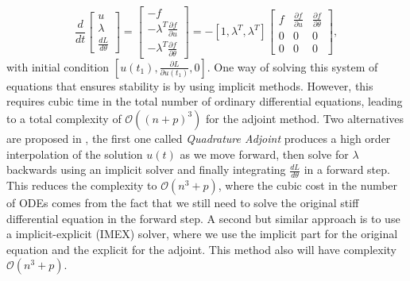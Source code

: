 \begin{equation}
    \frac{d}{dt}
    \begin{bmatrix}
       u \\
       \lambda \\
       \frac{dL}{d\theta}
    \end{bmatrix}
    = 
    \begin{bmatrix}
       -f \\
       - \lambda^T \frac{\partial f}{\partial u} \\
       - \lambda^T \frac{\partial f}{\partial \theta}
    \end{bmatrix}
    = 
    - [ 1, \lambda^T, \lambda^T ]
    \begin{bmatrix}
       f & \frac{\partial f}{\partial u} & \frac{\partial f}{\partial \theta} \\
       0 & 0 & 0 \\
       0 & 0 & 0
    \end{bmatrix},
\end{equation}
with initial condition $[u(t_1), \frac{\partial L}{\partial u(t_1)}, 0]$. One way of solving this system of equations that ensures stability is by using implicit methods. However, this requires cubic time in the total number of ordinary differential equations, leading to a total complexity of $\mathcal O((n+p)^3)$ for the adjoint method. Two alternatives are proposed in \cite{kim_stiff_2021}, the first one called \textit{Quadrature Adjoint} produces a high order interpolation of the solution $u(t)$ as we move forward, then solve for $\lambda$ backwards using an implicit solver and finally integrating $\frac{dL}{d\theta}$ in a forward step. This reduces the complexity to $\mathcal O (n^3 + p)$, where the cubic cost in the number of ODEs comes from the fact that we still need to solve the original stiff differential equation in the forward step. A second but similar approach is to use a implicit-explicit (IMEX) solver, where we use the implicit part for the original equation and the explicit for the adjoint. This method also will have complexity $\mathcal O (n^3 + p)$.